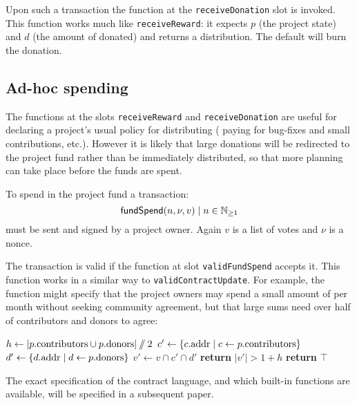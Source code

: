 Upon such a transaction the function at the \texttt{receiveDonation} slot is
invoked. This function works much like \texttt{receiveReward}: it expects $p$
(the project state) and $d$ (the amount of \oscoin{} donated) and returns a
distribution. The default will burn the donation.

\subsection{Ad-hoc spending}

The functions at the slots \texttt{receiveReward} and \texttt{receiveDonation}
are useful for declaring a project's usual policy for distributing \oscoin{}
(\eg{} paying for bug-fixes and small contributions, etc.). However it is likely
that large donations will be redirected to the project fund rather than be
immediately distributed, so that more planning can take place before the funds
are spent.

To spend \oscoin{} in the project fund a transaction:
\[
\mathsf{fundSpend}\small{\lparen n, \nu, v\rparen} \mid n \in \mathbb{N}_{\geq 1}
\]
must be sent and signed by a project owner. Again $v$ is a list of votes and
$\nu$ is a nonce.

The transaction is valid if the function at slot \texttt{validFundSpend} accepts
it. This function works in a similar way to \texttt{validContractUpdate}. For
example, the function might specify that the project owners may spend a small
amount of \oscoin{} per month without seeking community agreement, but that
large sums need over half of contributors and donors to agree:
\begin{algorithmic}[1]
    \State $h \gets |p.{\mathrm{contributors}} \cup p.{\mathrm{donors}}| \sslash 2$
    \State $c' \gets \{ c.{\mathrm{addr}} \mid c \gets p.{\mathrm{contributors}} \}$
    \State $d' \gets \{ d.{\mathrm{addr}} \mid d \gets p.{\mathrm{donors}} \}$
    \State $v' \gets v \cap c' \cap d'$
    \State \textbf{return} $|v'| > 1 + h$
    \Else
    \State \textbf{return} $\top$
\EndIf
\EndProcedure
\end{algorithmic}

The exact specification of the contract language, and which built-in functions
are available, will be specified in a subsequent paper.
